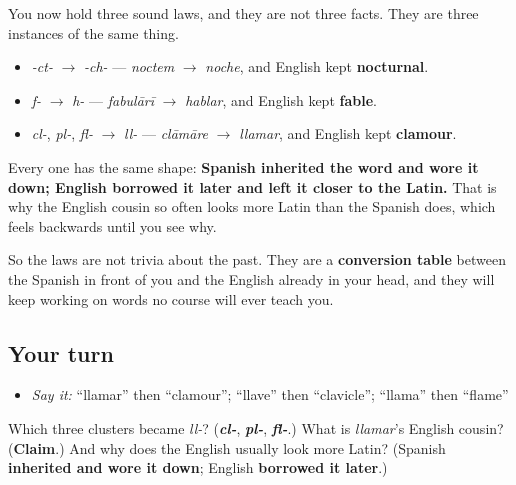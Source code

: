 \begin{culture}
You now hold three sound laws, and they are not three facts. They are three instances of the same thing.

\begin{itemize}
\raggedright
  \item \emph{-ct-} $\to$ \emph{-ch-} — \emph{noctem} $\to$ \emph{noche}, and English kept \textbf{nocturnal}.
  \item \emph{f-} $\to$ \emph{h-} — \emph{fabulārī} $\to$ \emph{hablar}, and English kept \textbf{fable}.
  \item \emph{cl-}, \emph{pl-}, \emph{fl-} $\to$ \emph{ll-} — \emph{clāmāre} $\to$ \emph{llamar}, and English kept \textbf{clamour}.
\end{itemize}

Every one has the same shape: \textbf{Spanish inherited the word and wore it down; English borrowed it later and left it closer to the Latin.} That is why the English cousin so often looks more Latin than the Spanish does, which feels backwards until you see why.

So the laws are not trivia about the past. They are a \textbf{conversion table} between the Spanish in front of you and the English already in your head, and they will keep working on words no course will ever teach you.
\end{culture}

\subsection*{Your turn}
\begin{itemize}
\raggedright
  \item \emph{Say it:} \textquotedblleft{}llamar\textquotedblright{} then \textquotedblleft{}clamour\textquotedblright{}; \textquotedblleft{}llave\textquotedblright{} then \textquotedblleft{}clavicle\textquotedblright{}; \textquotedblleft{}llama\textquotedblright{} then \textquotedblleft{}flame\textquotedblright{}
\end{itemize}

\begin{tcolorbox}[breakable,colback=teal!4,colframe=teal!35!black,title={Before you move on}]
Which three clusters became \emph{ll-}? (\emph{\textbf{cl-}}, \emph{\textbf{pl-}}, \emph{\textbf{fl-}}.) What is \emph{llamar}'s English cousin? (\textbf{Claim}.) And why does the English usually look more Latin? (Spanish \textbf{inherited and wore it down}; English \textbf{borrowed it later}.)
\end{tcolorbox}
